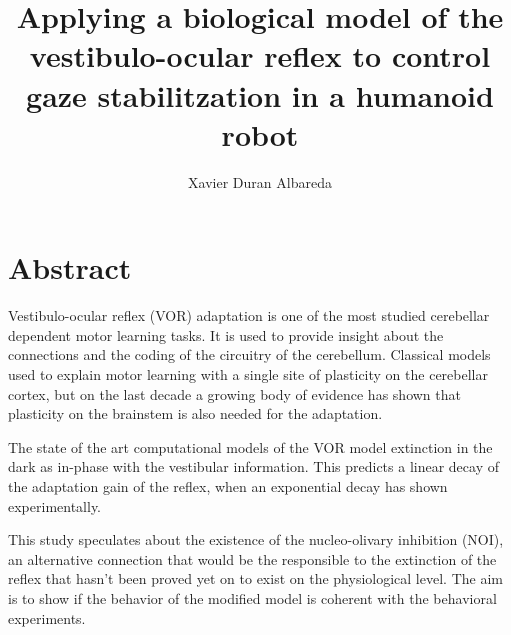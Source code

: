 \documentclass[12pt, a4paper,twoside]{tesi_upf}
\title{Applying a biological model of the vestibulo-ocular reflex to control gaze stabilitzation in a humanoid robot}
\author{Xavier Duran Albareda}
\begin{document}
\frontmatter

\maketitle

\cleardoublepage




\vspace*{\fill}
\section*{\Large \sffamily  Abstract}

Vestibulo-ocular reflex (VOR) adaptation is one of the most studied cerebellar dependent motor learning tasks. It is used to provide insight about the connections and the coding of the circuitry of the cerebellum. Classical models used to explain motor learning with a single site of plasticity on the cerebellar cortex, but on the last decade a growing body of evidence has shown that plasticity on the brainstem is also needed for the adaptation.

The state of the art computational models of the VOR model extinction in the dark as in-phase with the vestibular information. This predicts a linear decay of the adaptation gain of the reflex, when an exponential decay has shown experimentally.

This study speculates about the existence of the nucleo-olivary inhibition (NOI), an alternative connection that would be the responsible to the extinction of the reflex that hasn't been proved yet on to exist on the physiological level. The aim is to show if the behavior of the modified model is coherent with the behavioral experiments.

\vspace*{\fill}

\cleardoublepage


\tableofcontents
\end{document}

